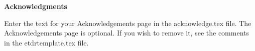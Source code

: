 
\newpage
\vspace*{0.9cm}
\begin{center}
{\bf \Huge Acknowledgments}
\end{center}

\setlength{\baselineskip}{0.8cm}



Enter the text for your Acknowledgements page in the acknowledge.tex
file. The Acknowledgements page is optional.  If you wish to remove
it, see the comments in the etdrtemplate.tex file.
